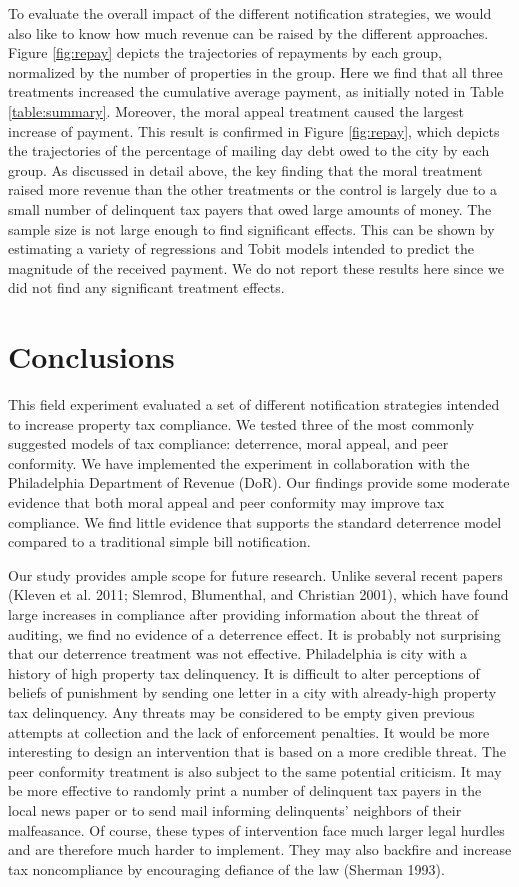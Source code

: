 \documentclass[12pt,titlepage]{article}
\begin{document}
To evaluate the overall impact of the different notification
strategies, we would also like to know how much revenue can be raised
by the different approaches.  Figure \ref{fig:repay} depicts the
trajectories of repayments by each group, normalized by the
number of properties in the group.  Here we find
that all three treatments increased the cumulative average payment,
as initially noted in Table \ref{table:summary}.
Moreover, the moral appeal treatment caused the largest increase of
payment.  This result is confirmed in Figure \ref{fig:repay}, which
depicts the trajectories of the percentage of mailing day debt owed to
the city by each group. As discussed in detail above, the key
finding that the moral treatment raised more revenue than the other
treatments or the control is largely due to a small number of
delinquent tax payers that owed large amounts of money.  The sample
size is not large enough to find significant effects. This can be
shown by estimating a variety of regressions and Tobit models intended
to predict the magnitude of the received payment. We do not
report these results here since we did not find any significant
treatment effects.


\section{Conclusions}

This field experiment evaluated a set of different notification
strategies intended to increase property tax compliance. We tested
three of the most commonly suggested models of tax compliance:
deterrence, moral appeal, and peer conformity.  We have implemented
the experiment in collaboration with the Philadelphia Department of
Revenue (DoR).  Our findings provide some moderate evidence that
both moral appeal and peer conformity may improve tax compliance. We
find little evidence that supports the standard deterrence model
compared to a traditional simple bill notification.

Our study provides ample scope for future research.  Unlike several
recent papers (Kleven et al. 2011; Slemrod, Blumenthal, and Christian
2001), which have found large increases in compliance after providing
information about the threat of auditing, we find no evidence of a
deterrence effect.  It is probably not surprising that our deterrence
treatment was not effective. Philadelphia is city with a history of
high property tax delinquency. It is difficult to alter perceptions of
beliefs of punishment by sending one letter in a city with
already-high property tax delinquency.  Any threats may be considered
to be empty given previous attempts at collection and the lack of
enforcement penalties.  It would be more interesting to design an
intervention that is based on a more credible threat.  The peer
conformity treatment is also subject to the same potential
criticism. It may be more effective to randomly print a number of
delinquent tax payers in the local news paper or to send mail
informing delinquents' neighbors of their malfeasance. Of course, these types of intervention face
much larger legal hurdles and are therefore much harder to implement.
They may also backfire and increase tax noncompliance by encouraging
defiance of the law (Sherman 1993).
\end{document}
